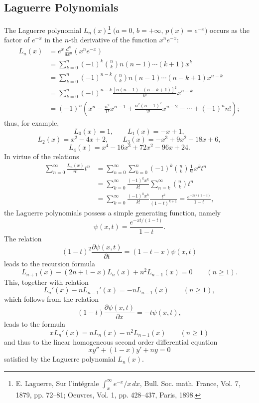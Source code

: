 \subsection{Laguerre Polynomials}
The Laguerre polynomial $L_n(x)$\footnote{E. Laguerre, Sur l'int\'egrale $\int_x^\infty e^{-x}/x\,dx$, Bull. Soc. math. France, Vol. 7, 1879, pp. 72--81; Oeuvres, Vol. 1, pp. 428--437, Paris, 1898.} $(a=0$, $b=+\infty$, $p(x)=e^{-x})$ occurs as the factor of $e^{-x}$ in the $n$-th derivative of the function $x^ne^{-x}$:
\[
\begin{aligned}
L_n(x)
&=e^x\frac{d^n}{dx^n}(x^ne^{-x})\\
&=\sum_{k=0}^n(-1)^k\binom nk n(n-1)\cdots(k+1)x^k\\
&=\sum_{k=0}^n(-1)^{n-k}\binom nk n(n-1)\cdots(n-k+1)x^{n-k}\\
&=\sum_{k=0}^n(-1)^{n-k}\frac{[n(n-1)\cdots(n-k+1)]^2}{k!}x^{n-k}\\
&=(-1)^n\left(x^n-\frac{n^2}{1!}x^{n-1}
+\frac{n^2(n-1)^2}{2!}x^{n-2}-\cdots+(-1)^n n!\right);
\end{aligned}
\]
thus, for example,
\[
L_0(x)=1,\qquad L_1(x)=-x+1,
\]
\[
L_2(x)=x^2-4x+2,\qquad L_3(x)=-x^3+9x^2-18x+6,
\]
\[
L_4(x)=x^4-16x^3+72x^2-96x+24.
\]
In virtue of the relations
\[
\begin{aligned}
\sum_{n=0}^{\infty}\frac{L_n(x)}{n!}t^n
&=\sum_{n=0}^{\infty}\sum_{k=0}^n(-1)^k\binom nk\frac{1}{k!}x^kt^n\\
&=\sum_{k=0}^{\infty}\frac{(-1)^kx^k}{k!}\sum_{n=k}^{\infty}\binom nk t^n\\
&=\sum_{k=0}^{\infty}\frac{(-1)^kx^k}{k!}\frac{t^k}{(1-t)^{k+1}}
=\frac{e^{-xt/(1-t)}}{1-t},
\end{aligned}
\]
the Laguerre polynomials possess a simple generating function, namely
\[
\psi(x,t)=\frac{e^{-xt/(1-t)}}{1-t}.
\]
The relation
\[
(1-t)^2\frac{\partial\psi(x,t)}{\partial t}=(1-t-x)\psi(x,t)
\]
leads to the recursion formula
\begin{equation}
L_{n+1}(x)-(2n+1-x)L_n(x)+n^2L_{n-1}(x)=0\qquad(n\ge1).
\tag{33}
\end{equation}
This, together with relation
\begin{equation}
L_n'(x)-nL_{n-1}'(x)=-nL_{n-1}(x)\qquad(n\ge1),
\tag{34}
\end{equation}
which follows from the relation
\[
(1-t)\frac{\partial\psi(x,t)}{\partial x}=-t\psi(x,t),
\]
leads to the formula
\begin{equation}
xL_n'(x)=nL_n(x)-n^2L_{n-1}(x)\qquad(n\ge1)
\tag{35}
\end{equation}
and thus to the linear homogeneous second order differential equation
\begin{equation}
xy''+(1-x)y'+ny=0
\tag{36}
\end{equation}
satisfied by the Laguerre polynomial $L_n(x)$.

